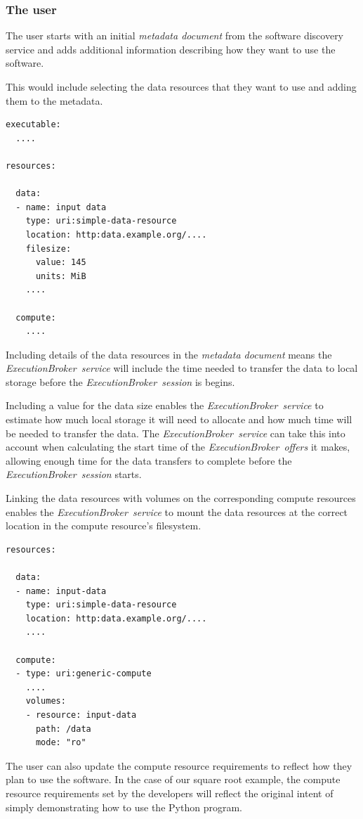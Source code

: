 \documentclass[11pt,a4paper]{ivoa}
\newcommand{\execbrokerservice}[1] {\textit{ExecutionBroker~service#1}}
\newcommand{\execoffer}[1] {\textit{ExecutionBroker~offer#1}}
\newcommand{\execsession}[1] {\textit{ExecutionBroker~session#1}}
\newcommand{\metadoc} [1]{\textit{metadata document#1}}
\newcommand{\pythonprogram} {Python program}
\begin{document}
\subsubsection{The user}
\label{software-user}

The user starts with an initial \metadoc{} from the
software discovery service and adds additional information describing how they
want to use the software.

This would include selecting the data resources that they want to use
and adding them to the metadata.

\begin{lstlisting}[]
executable:
  ....

resources:

  data:
  - name: input data
    type: uri:simple-data-resource
    location: http:data.example.org/....
    filesize:
      value: 145
      units: MiB
    ....

  compute:
    ....
\end{lstlisting}

Including details of the data resources in the \metadoc{} means the \execbrokerservice{}
will include the time needed to transfer the data to local storage before the
\execsession{} is begins.

Including a value for the data size enables the \execbrokerservice{} to estimate
how much local storage it will need to allocate
and how much time will be needed to transfer the data.
The \execbrokerservice{} can take this into account when calculating the start time of
the \execoffer{s} it makes, allowing enough time for the data transfers to complete
before the \execsession{} starts.

Linking the data resources with volumes on the corresponding compute resources enables
the \execbrokerservice{} to mount the data resources at the correct location in
the compute resource's filesystem.

\begin{lstlisting}[]
resources:

  data:
  - name: input-data
    type: uri:simple-data-resource
    location: http:data.example.org/....
    ....

  compute:
  - type: uri:generic-compute
    ....
    volumes:
    - resource: input-data
      path: /data
      mode: "ro"

\end{lstlisting}

The user can also update the compute resource requirements to reflect how they plan
to use the software.
In the case of our square root example, the compute resource requirements set by the
developers will reflect the original intent of simply demonstrating how to use the
\pythonprogram{}.
\end{document}
